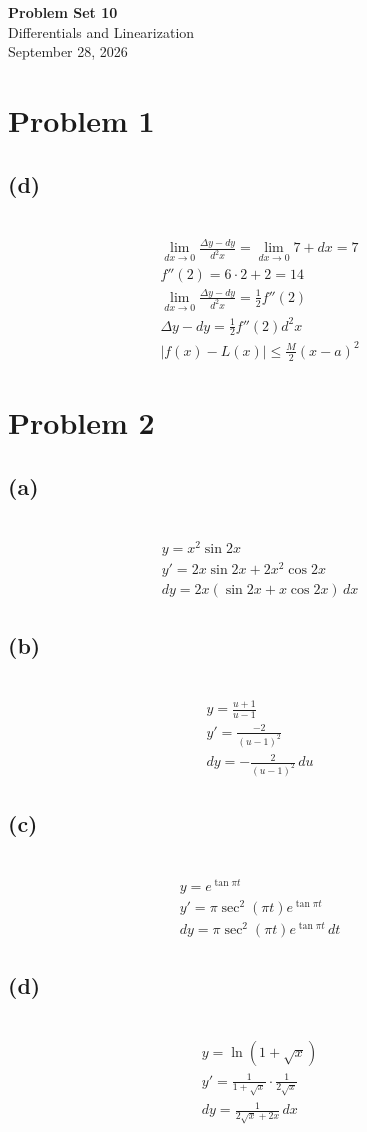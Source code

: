 \documentclass[12pt]{article}
\newcommand{\problem}[1]{\section{Problem #1}}
\newcommand{\subproblem}[1]{\subsection{(#1)} \,}
\begin{document}
\vspace*{0cm}

\begin{center}
    {\Large \bfseries Problem Set 10} \\[0.5cm]
    {\large Differentials and Linearization} \\[0.35cm]
    {\normalsize September 28, 2026}
\end{center}


\problem{1}

\subproblem{d}
\begin{gather*}
    \lim_{dx\to 0} \frac{\Delta y-dy}{d^2x}=\lim_{dx\to 0} 7+dx=7\\
    f''(2)=6\cdot 2+2=14\\
    \lim_{dx\to 0} \frac{\Delta y-dy}{d^2x} =\frac{1}{2}f''(2)\\
    \Delta y-dy= \frac{1}{2}f''(2) d^2x\\
    |f(x)-L(x)|\le \frac{M}{2}(x-a)^2
\end{gather*}

\problem{2}

\subproblem{a}
\begin{gather*}
    y=x^2\sin 2x\\
    y'=2x\sin 2x+2x^2\cos 2x\\
    dy=\boxed{2x(\sin 2x+x\cos 2x)\, dx}
\end{gather*}

\subproblem{b}
\begin{gather*}
    y=\frac{u+1}{u-1}\\
    y'=\frac{-2}{(u-1)^2}\\
    dy=\boxed{-\frac{2}{(u-1)^2}\, du}
\end{gather*}

\subproblem{c}
\begin{gather*}
    y=e^{\tan \pi t}\\
    y'=\pi \sec^2 (\pi t)e^{\tan \pi t}\\
    dy=\boxed{\pi \sec^2 (\pi t)e^{\tan \pi t}\, dt}
\end{gather*}

\subproblem{d}
\begin{gather*}
    y=\ln (1+\sqrt x)\\
    y'=\frac{1}{1+\sqrt{x}}\cdot \frac{1}{2\sqrt{x}}\\
    dy=\boxed{\frac{1}{2\sqrt{x}+2x}\, dx}
\end{gather*}
\end{document}
